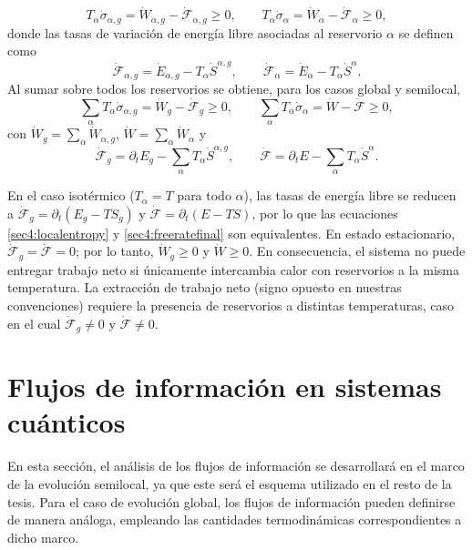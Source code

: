 \begin{equation}
    T_{\alpha}\dot{\sigma}_{\alpha,g}
    = \dot{W}_{\alpha,g}-\dot{\mathcal{F}}_{\alpha,g}\ge 0,
    \qquad
    T_{\alpha}\dot{\sigma}_{\alpha}
    = \dot{W}_{\alpha}-\dot{\mathcal{F}}_{\alpha}\ge 0,
    \label{sec4:localfreerate}
\end{equation}
donde las tasas de variación de energía libre asociadas al reservorio $\alpha$ se definen como
\[
\dot{\mathcal{F}}_{\alpha,g}
= \dot{E}_{\alpha,g}-T_{\alpha}\dot{S}^{\alpha,g},
\qquad
\dot{\mathcal{F}}_{\alpha}
= \dot{E}_{\alpha}-T_{\alpha}\dot{S}^{\alpha}.
\]
Al sumar sobre todos los reservorios se obtiene, para los casos global y semilocal,
\begin{equation}
    \sum_{\alpha}T_{\alpha}\dot{\sigma}_{\alpha,g}
    = \dot{W}_{g}-\dot{\mathcal{F}}_{g}\ge 0,
    \qquad
    \sum_{\alpha}T_{\alpha}\dot{\sigma}_{\alpha}
    = \dot{W}-\dot{\mathcal{F}}\ge 0,
    \label{sec4:freeratefinal}
\end{equation}
con $\dot{W}_{g}=\sum_{\alpha}\dot{W}_{\alpha,g}$,
$\dot{W}=\sum_{\alpha}\dot{W}_{\alpha}$ y
\[
\dot{\mathcal{F}}_{g}
=\partial_{t}E_{g}-\sum_{\alpha}T_{\alpha}\dot{S}^{\alpha,g},
\qquad
\dot{\mathcal{F}}
=\partial_{t}E-\sum_{\alpha}T_{\alpha}\dot{S}^{\alpha}.
\]

En el caso isotérmico ($T_{\alpha}=T$ para todo $\alpha$), las tasas de energía libre se reducen a
$\dot{\mathcal{F}}_{g}=\partial_{t}(E_{g}-TS_{g})$ y
$\dot{\mathcal{F}}=\partial_{t}(E-TS)$, por lo que las ecuaciones
\eqref{sec4:localentropy} y \eqref{sec4:freeratefinal} son equivalentes. En estado estacionario,
$\dot{\mathcal{F}}_{g}=\dot{\mathcal{F}}=0$; por lo tanto,
$\dot{W}_{g}\ge 0$ y $\dot{W}\ge 0$. En consecuencia, el sistema no puede entregar trabajo neto si únicamente intercambia calor con reservorios a la misma temperatura. La extracción de trabajo neto (signo opuesto en nuestras convenciones) requiere la presencia de reservorios a distintas temperaturas, caso en el cual $\dot{\mathcal{F}}_{g}\neq 0$ y $\dot{\mathcal{F}}\neq 0$.


\section{Flujos de información en sistemas cuánticos}

En esta sección, el análisis de los flujos de información se desarrollará en el marco de la evolución semilocal, ya que este será el esquema utilizado en el resto de la tesis. Para el caso de evolución global, los flujos de información pueden definirse de manera análoga, empleando las cantidades termodinámicas correspondientes a dicho marco.
\\

